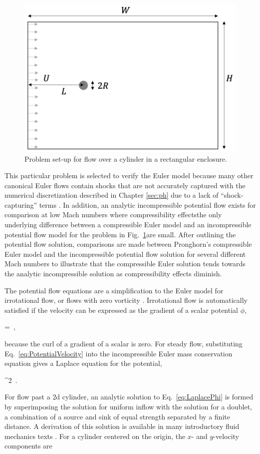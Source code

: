 \begin{figure}[!h]
\centering
\includegraphics[width=0.5\linewidth]{figs/pf_geometry.png}
\caption{Problem set-up for flow over a cylinder in a rectangular enclosure.}
\label{fig:pf_geometry}
\end{figure}

This particular problem is selected to verify the Euler model because many other canonical Euler flows contain shocks that are not accurately captured with the numerical discretization described in Chapter \ref{sec:ph} due to a lack of ``shock-capturing'' terms \cite{hughes_1986,tezduyar_1986}. In addition, an analytic incompressible potential flow exists for comparison at low Mach numbers where compressibility effects\mdash the only underlying difference between a compressible Euler model and an incompressible potential flow model for the problem in Fig.\ \ref{fig:pf_geometry}\mdash are small. After outlining the potential flow solution, comparisons are made between Pronghorn's compressible Euler model and the incompressible potential flow solution for several different Mach numbers to illustrate that the compressible Euler solution tends towards the analytic incompressible solution as compressibility effects diminish.

The potential flow equations are a simplification to the Euler model for irrotational flow, or flows with zero vorticity \cite{munson,hirsch}. Irrotational flow is automatically satisfied if the velocity can be expressed as the gradient of a scalar potential \(\phi\),

\beq
\label{eq:PotentialVelocity}
=\nabla\phi\ ,
\eeq

\noindent because the curl of a gradient of a scalar is zero. For steady flow, substituting Eq.\ \eqref{eq:PotentialVelocity} into the incompressible Euler mass conservation equation gives a Laplace equation for the potential,

\beq
\label{eq:LaplacePhi}
\nabla^2\ .
\eeq

\noindent For flow past a \gls{2d} cylinder, an analytic solution to Eq.\ \eqref{eq:LaplacePhi} is formed by superimposing the solution for uniform inflow with the solution for a doublet, a combination of a source and sink of equal strength separated by a finite distance. A derivation of this solution is available in many introductory fluid mechanics texts \cite{munson}. For a cylinder centered on the origin, the \(x\)- and \(y\)-velocity components are

